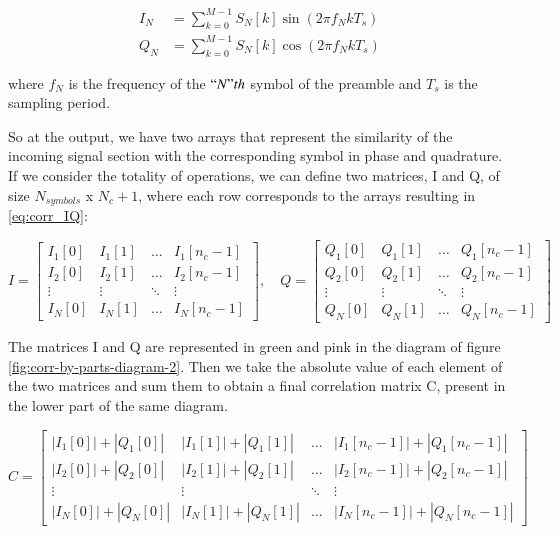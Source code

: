 \begin{equation}
\label{eq:corr_IQ}
\begin{split}
    I_{N} &= \sum_{k=0}^{M-1} S_{N}[k] \sin(2 \pi f_{N} k T_s) \\
    Q_{N} &= \sum_{k=0}^{M-1} S_{N}[k] \cos(2 \pi f_{N} k T_s)
\end{split}
\end{equation}

where $f_N$ is the frequency of the $``N"th$ symbol of the preamble and $T_s$ is the sampling period.
\newp

So at the output, we have two arrays that represent the similarity of the incoming signal section with the corresponding symbol in phase and quadrature. If we consider the totality of operations, we can define two matrices, I and Q, of size $N_{symbols}$ x $N_c + 1$, where each row corresponds to the arrays resulting in \ref{eq:corr_IQ}:

\begin{equation}
\label{eq:matrix_IQ}
    I = \begin{bmatrix}
    I_{1}[0] & I_{1}[1] & \dots & I_{1}[n_c-1] \\
    I_{2}[0] & I_{2}[1] & \dots & I_{2}[n_c-1] \\
    \vdots & \vdots & \ddots & \vdots \\
    I_{N}[0] & I_{N}[1] & \dots & I_{N}[n_c-1]
    \end{bmatrix}, \quad
    Q = \begin{bmatrix}
    Q_{1}[0] & Q_{1}[1] & \dots & Q_{1}[n_c-1] \\
    Q_{2}[0] & Q_{2}[1] & \dots & Q_{2}[n_c-1] \\
    \vdots & \vdots & \ddots & \vdots \\
    Q_{N}[0] & Q_{N}[1] & \dots & Q_{N}[n_c-1]
    \end{bmatrix}
\end{equation}

The matrices I and Q are represented in green and pink in the diagram of figure \ref{fig:corr-by-parts-diagram-2}. Then we take the absolute value of each element of the two matrices and sum them to obtain a final correlation matrix C, present in the lower part of the same diagram.

\begin{equation}
\label{eq:final_correlation_matrix}
    C = \begin{bmatrix}
    |I_{1}[0]| + |Q_{1}[0]| & |I_{1}[1]| + |Q_{1}[1]| & \dots & |I_{1}[n_c-1]| + |Q_{1}[n_c-1]| \\
    |I_{2}[0]| + |Q_{2}[0]| & |I_{2}[1]| + |Q_{2}[1]| & \dots & |I_{2}[n_c-1]| + |Q_{2}[n_c-1]| \\
    \vdots & \vdots & \ddots & \vdots \\
    |I_{N}[0]| + |Q_{N}[0]| & |I_{N}[1]| + |Q_{N}[1]| & \dots & |I_{N}[n_c-1]| + |Q_{N}[n_c-1]|
    \end{bmatrix}
\end{equation}


